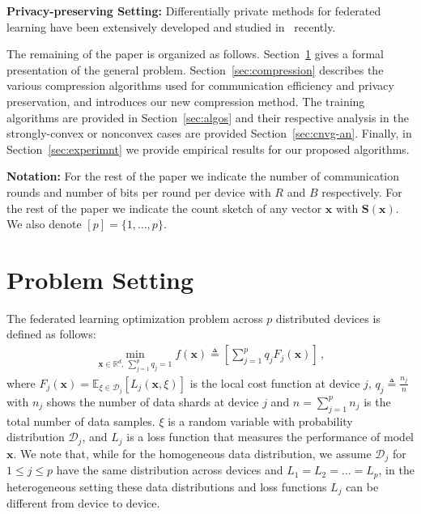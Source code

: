 \documentclass[twoside]{article}
\newcommand{\todo}[1]{\textcolor{red}{ToDo:~#1}}
\begin{document}
\vspace{0.1in}\noindent\textbf{Privacy-preserving Setting:} Differentially private methods for federated learning have been extensively developed and studied in~\cite{li2019privacy,liu2019enhancing} recently. 

\vspace{0.1in}

The remaining of the paper is organized as follows.
Section~\ref{sec:problem} gives a formal presentation of the general problem. 
Section~\ref{sec:compression} describes the various compression algorithms used for communication efficiency and privacy preservation, and introduces our new compression method.
The training algorithms are provided in Section~\ref{sec:algos} and their respective analysis in the strongly-convex or nonconvex cases are provided Section~\ref{sec:cnvg-an}. Finally, in Section~\ref{sec:experimnt} we provide empirical results for our proposed algorithms. 


\vspace{0.1in}\noindent\textbf{Notation:} For the rest of the paper we indicate the number of communication rounds and number of bits per round per device with $R$ and $B$ respectively. For the rest of the paper we indicate the count sketch of any vector $\boldsymbol{x}$ with $\mathbf{S}(\boldsymbol{x})$. We also denote $[p] =\{1,\dots,p\}$.



\section{Problem Setting}
\label{sec:problem}


The federated learning optimization problem across $p$ distributed devices is defined as follows:
\begin{align}\label{eq:main}
   \min_{\boldsymbol{x}\in \mathbb{R}^{d},\: \sum_{j=1}^pq_j=1} f(\boldsymbol{x})\triangleq \left[\sum_{j=1}^{p}q_jF_j(\boldsymbol{x})\right] \, , 
\end{align}
where $F_j(\boldsymbol{x})=\mathbb{E}_{\xi\in\mathcal{D}_j}\left[L_j\left(\boldsymbol{x},\xi\right)\right]$ is the local cost function at device $j$, $q_j\triangleq\frac{n_j}{n}$ with $n_j$ shows the number of data shards at device $j$ and $n=\sum_{j=1}^pn_j$ is the total number of data samples.
$\xi$ is a random variable with probability distribution $\mathcal{D}_j$, and $L_j$ is a loss function that measures the performance of model $\boldsymbol{x}$. 
We note that, while for the homogeneous data distribution, we assume $\mathcal{D}_j$ for $1\leq j\leq p$ have the same distribution across devices and $L_1=L_2=\ldots=L_p$, in the heterogeneous setting these data distributions and loss functions $L_j$ can be different from device to device. 
\end{document}
